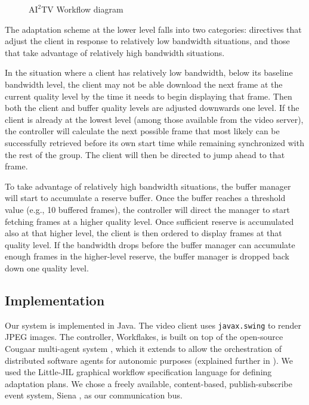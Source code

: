 \documentclass{sig-alternate}
\begin{document}
\begin{figure} 
  \centering
  \hspace*{-5mm}
  \caption{$\mathrm{AI}^2$TV Workflow diagram }
  \label{ljil}
\end{figure}

The adaptation scheme at the lower level falls into two categories:
directives that adjust the client in response to relatively low
bandwidth situations, and those that take advantage of relatively high
bandwidth situations.

In the situation where a client has relatively low bandwidth, below
its baseline bandwidth level, the client may not be able download the
next frame at the current quality level by the time it needs to begin
displaying that frame.  Then both the client and buffer quality levels
are adjusted downwards one level.  If the client is already at the
lowest level (among those available from the video server), the
controller will calculate the next possible frame that most likely can
be successfully retrieved before its own start time while remaining
synchronized with the rest of the group.  The client will then be
directed to jump ahead to that frame.

To take advantage of relatively high bandwidth situations, the buffer
manager will start to accumulate a reserve buffer.  Once the buffer
reaches a threshold value (e.g., 10 buffered frames), the controller
will direct the manager to start fetching frames at a higher quality
level.  Once sufficient reserve is accumulated also at that higher
level, the client is then ordered to display frames at that quality
level.  If the bandwidth drops before the buffer manager can
accumulate enough frames in the higher-level reserve, the buffer
manager is dropped back down one quality level.

\subsection{Implementation} \label{implementation}

Our system is implemented in Java. The video client uses
\texttt{javax.swing} to render JPEG images.  The controller,
Workflakes, is built on top of the open-source Cougaar multi-agent
system \cite{COUGAAR}, which it extends to allow the orchestration of
distributed software agents for autonomic purposes (explained further
in \cite{ICSE}).  We used the Little-JIL graphical workflow
specification language \cite{LJIL} for defining adaptation plans.  We
chose a freely available, content-based, publish-subscribe event
system, Siena \cite{SIENA}, as our communication bus.
\end{document}
